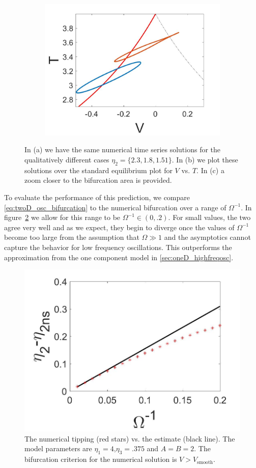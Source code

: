 \begin{figure}[H]
\begin{subfigure}{.5\textwidth}
 \includegraphics[width=\linewidth]{twoD/osc_bif_Tplot_zoom.jpg}
 \caption{}
\end{subfigure}
\caption{In (a) we have the same numerical time series solutions for the qualitatively different cases $\eta_2=\{2.3,1.8,1.51\}$. In (b) we plot these solutions over the standard equilibrium plot for $V$ vs. $T$. In (c) a zoom closer to the bifurcation area is provided.}
\label{fig:twoD_osc_Tnumerics}
\end{figure}

\indent To evaluate the performance of this prediction, we compare \eqref{eq:twoD_osc_bifurcation} to the numerical bifurcation over a range of $\Omega^{-1}$. In figure~\ref{fig:twoD_osc_epscomp} we allow for this range to be $\Omega^{-1}\in (0,.2)$. For small values, the two agree very well and as we expect, they begin to diverge once the values of $\Omega^{-1}$ become too large from the assumption that $\Omega\gg 1$ and the asymptotics cannot capture the behavior for low frequency oscillations. This outperforms the approximation from the one component model in \autoref{sec:oneD_highfreqosc}.

\begin{figure}[H]
\centering
\includegraphics[width = .7\linewidth]{twoD/osc_Omegacomp.jpg}
\caption{The numerical tipping (red stars) vs. the estimate (black line). The model parameters are $\eta_1=4$,$\eta_3=.375$ and $A=B=2$. The bifurcation criterion for the numerical solution is $V>V_{\text{smooth}}$.}
\label{fig:twoD_osc_epscomp}
\end{figure}

